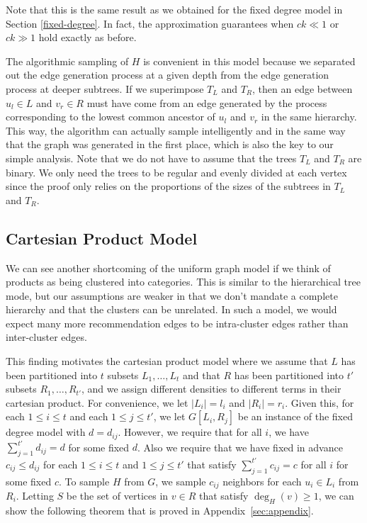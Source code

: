 Note that this is the same result as we obtained for the fixed degree
model in Section \ref{fixed-degree}. In fact, the approximation
guarantees when $ck \ll 1$ or $ck \gg 1$ hold exactly as before.\vs

The algorithmic sampling of $H$ is convenient in this model because we separated
out the edge generation process at a given depth from the edge
generation process at deeper subtrees. 
If we superimpose $T_L$
and $T_R$, then an edge between $u_l\in L$ and $v_r\in R$ must have
come from an edge generated by the process corresponding to the lowest common ancestor of $u_l$ and $v_r$ in the same hierarchy. This way, the algorithm can actually sample intelligently and in the same way that the graph was generated in the first place, which is also the key to our simple analysis. Note
that we do not have to assume that the trees $T_L$ and $T_R$ are
binary. We only need the trees to be regular and evenly divided at
each vertex since the proof only relies on the proportions of the
sizes of the subtrees in $T_L$ and $T_R$.


\subsection{Cartesian Product Model}
\label{cartesian}
We can see another shortcoming of the uniform graph model if we think
of products as being clustered into categories. This is similar to the
hierarchical tree mode, but our assumptions are weaker in that we don't
mandate a complete hierarchy and that the clusters can be unrelated. In
such a model, we would expect many more recommendation edges to be
intra-cluster edges rather than inter-cluster edges.


This finding motivates the cartesian product model where we assume that
$L$ has been partitioned into $t$ subsets $L_1,\ldots, L_t$ and
that $R$ has been partitioned into $t'$ subsets $R_1,\ldots,
R_{t'}$, and we assign different densities to different terms in their cartesian product. For convenience, we let $|L_i| = l_i$ and $|R_i|=r_i$. Given
this, for each $1\leq i\leq t$ and each $1\leq j\leq t'$,
we let $G[L_i, R_j]$ be an instance of the fixed degree model with
$d=d_{ij}$. However, we require that for all $i$, we have $\sum_{j=1}^{t'}
d_{ij} = d$ for some fixed $d$. Also we require that we have fixed in
advance $c_{ij} \leq d_{ij}$ for each $1\leq i\leq t$ and $1\leq j\leq t'$ that
satisfy $\sum_{j=1}^{t'} c_{ij} = c$ for all $i$ for some fixed $c$.
To sample $H$ from $G$, we sample $c_{ij}$ neighbors for each
$u_i\in L_i$ from $R_i$. Letting $S$ be the set of vertices in
$v\in R$ that satisfy $\deg_H(v)\geq 1$, we can show the following theorem
that is proved in Appendix~\ref{sec:appendix}.

